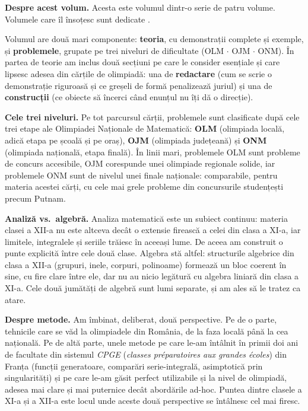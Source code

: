 \noindent \textbf{Despre acest volum.} Acesta este volumul \numarvolum{} dintr-o serie de patru volume.
\despreacestvolum{} Volumele care îl însoțesc sunt dedicate \celelaltevolume.

\medskip
\noindent Volumul are două mari componente: \textbf{teoria}, cu demonstrații complete și exemple, și \textbf{problemele}, grupate pe trei niveluri de dificultate (OLM $\cdot$ OJM $\cdot$ ONM). În partea de teorie am inclus două secțiuni pe care le consider esențiale și care lipsesc adesea din cărțile de olimpiadă: una de \textbf{redactare} (cum se scrie o demonstrație riguroasă și ce greșeli de formă penalizează juriul) și una de \textbf{construcții} (ce obiecte să încerci când enunțul nu îți dă o direcție).

\medskip
\noindent \textbf{Cele trei niveluri.} Pe tot parcursul cărții, problemele sunt clasificate după cele trei
etape ale Olimpiadei Naționale de Matematică: \textbf{OLM} (olimpiada locală, adică etapa pe școală și pe oraș),
\textbf{OJM} (olimpiada județeană) și \textbf{ONM} (olimpiada națională, etapa finală). În linii mari,
problemele OLM sunt probleme de concurs accesibile, OJM corespunde unei olimpiade regionale solide, iar
problemele ONM sunt de nivelul unei finale naționale: comparabile, pentru materia acestei cărți, cu cele mai
grele probleme din concursurile studențești precum Putnam.

\medskip
\noindent \textbf{Analiză vs.\ algebră.} Analiza matematică este un subiect continuu: materia clasei a XII-a nu este altceva decât o extensie firească a celei din clasa a XI-a, iar limitele, integralele și seriile trăiesc în aceeași lume. De aceea am construit o punte explicită între cele două clase. Algebra stă altfel: structurile algebrice din clasa a XII-a (grupuri, inele, corpuri, polinoame) formează un bloc coerent în sine, cu fire clare între ele, dar nu au nicio legătură cu algebra liniară din clasa a XI-a. Cele două jumătăți de algebră sunt lumi separate, și am ales să le tratez ca atare.

\medskip
\noindent \textbf{Despre metode.} Am îmbinat, deliberat, două perspective. Pe de o parte, tehnicile care se văd la olimpiadele din România, de la faza locală până la cea națională. Pe de altă parte, unele metode pe care le-am întâlnit în primii doi ani de facultate din sistemul \emph{CPGE} (\textit{classes préparatoires aux grandes écoles}) din Franța (funcții generatoare, comparări serie-integrală, asimptotică prin singularități) și pe care le-am găsit perfect utilizabile și la nivel de olimpiadă, adesea mai clare și mai puternice decât abordările ad-hoc. Puntea dintre clasele a XI-a și a XII-a este locul unde aceste două perspective se întâlnesc cel mai firesc.

